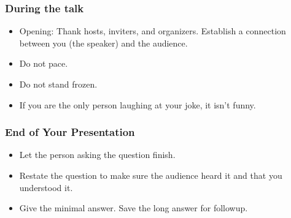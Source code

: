 \subsubsection*{During the talk}
\begin{itemize}
    \item Opening: Thank hosts, inviters, and organizers. Establish a connection between you (the speaker) and the audience.
    \item Do not pace.
    \item Do not stand frozen.
    \item If you are the only person laughing at your joke, it isn't funny.
\end{itemize}

 \subsubsection*{End of Your Presentation}

\begin{itemize}
    \item Let the person asking the question finish.
    \item Restate the question to make sure the audience heard it and that you understood it.
    \item Give the minimal answer. Save the long answer for followup.
\end{itemize}


